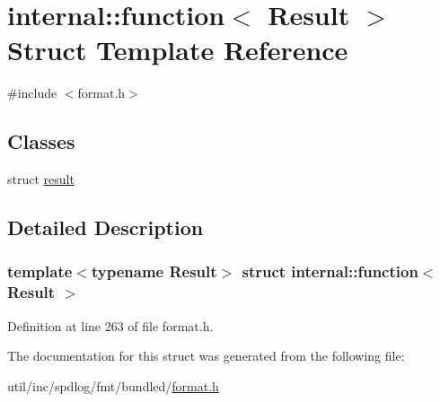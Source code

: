 \hypertarget{structinternal_1_1function}{}\section{internal\+:\+:function$<$ Result $>$ Struct Template Reference}
\label{structinternal_1_1function}


{\ttfamily \#include $<$format.\+h$>$}

\subsection*{Classes}
\begin{DoxyCompactItemize}
\item 
struct \hyperlink{structinternal_1_1function_1_1result}{result}
\end{DoxyCompactItemize}


\subsection{Detailed Description}
\subsubsection*{template$<$typename Result$>$\newline
struct internal\+::function$<$ Result $>$}



Definition at line 263 of file format.\+h.



The documentation for this struct was generated from the following file\+:\begin{DoxyCompactItemize}
\item 
util/inc/spdlog/fmt/bundled/\hyperlink{format_8h}{format.\+h}\end{DoxyCompactItemize}
